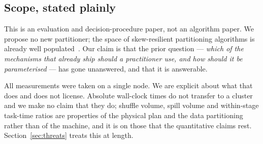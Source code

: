 \subsection{Scope, stated plainly}

This is an evaluation and decision-procedure paper, not an algorithm paper. We
propose no new partitioner; the space of skew-resilient partitioning algorithms
is already well populated~\cite{irandoost2019skewslr, gufler2011skew,
myung2016handling, shen2020srspark, tang2021intermediate}. Our claim is that
the prior question --- \emph{which of the mechanisms that already ship should a
practitioner use, and how should it be parameterised} --- has gone unanswered,
and that it is answerable.

All measurements were taken on a single node. We are explicit about what that
does and does not license. Absolute wall-clock times do not transfer to a
cluster and we make no claim that they do; shuffle volume, spill volume and
within-stage task-time ratios are properties of the physical plan and the data
partitioning rather than of the machine, and it is on those that the
quantitative claims rest. Section~\ref{sec:threats} treats this at length.

